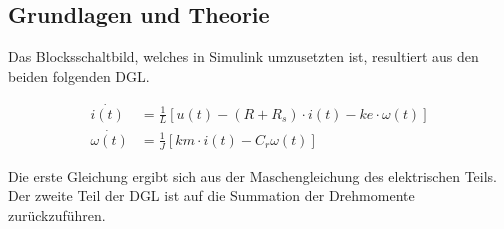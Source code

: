 \subsection{Grundlagen und Theorie}

Das Blocksschaltbild, welches in Simulink umzusetzten ist, resultiert aus
den beiden folgenden DGL.

\begin{equation} \label{eq211}
    \begin{split}
        \dot{i(t)}&=\frac{1}{L} \left[ u(t) - (R + R_s) \cdot i(t) - ke \cdot \omega(t) \right]\\
        \dot{\omega(t)}&=\frac{1}{J} \left[km \cdot i(t) -C_r \omega(t) \right]
    \end{split}
\end{equation}

Die erste Gleichung ergibt sich aus der Maschengleichung des elektrischen Teils.
Der zweite Teil der DGL ist auf die Summation der Drehmomente zurückzuführen.